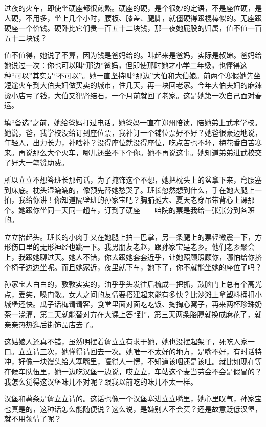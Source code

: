 \documentclass[lang=cn,newtx,12pt,scheme=chinese]{elegantbook}
\begin{document}
过夜的火车，即使坐硬座都很煎熬。硬座的硬，是个很妙的定语，不是座位硬，是人硬，不用多，坐上几个小时，腰板、膝盖、腿脚，就僵硬得跟棍棒似的。无座跟硬座一个价钱。硬卧比它们贵一百五十二块钱，那一夜她屁股的归属，值不值一百五十二块钱？

值不值得，她说了不算，因为钱是爸妈给的。叫起来是爸妈，实际是叔婶。爸妈给她说过一次：你也可以叫“那边”爸妈，但即使那时她才小学二年级，也懂得这种“可以”其实是“不可以”。她一直坚持叫“那边”大伯和大伯娘。前两个寒假她先坐短途火车到大伯夫妇做买卖的城市，住几天，再一块回老家。今年大伯夫妇的麻辣烫小店亏了钱，大伯又犯肾结石，一个月前就回了老家。这是她第一次自己面对春运。

填“备选”之前，她给爸妈打过电话。她爸妈一直在郑州陪读，陪她弟上武术学校。她说，爸，我学校没给订到座位票，我补订一个铺位票好不好？她爸很豪迈地说，年轻人，出力长力，补啥补？没得座位就没得座位，吃点苦也不坏，梅花香自苦寒来。再说那么大个火车，哪儿还坐不下个你。她不再说这事。她知道弟弟进武校交了好大一笔赞助费。

所以立立不想答班长那句话，为了掩饰这个不想，她把枕头上的盆拿下来，弯腰塞到床底。枕头湿漉漉的，像预先替她愁哭了。班长忽然想到什么，手在她大腿上一拍，我给你讲！你知道隔壁班的孙家宝吧？胸脯挺大、夏天老穿吊带背心上课那个。她跟你坐同一天同一趟车，订到了硬座——咱院的票是我给一张张分到各班的。

立立抬起头。班长的小肉手又在她腿上拍一巴掌，另一条腿上的票轻微震一下，方形伤口里的无形神经也跳一下。我男朋友老赵，跟孙家宝是老乡。他们老乡聚会上，我跟她聊过天。她人不错，你去跟她套套近乎，让她照顾照顾你，哪怕给你挤个椅子边边坐呢。而且她家近，夜里就下车，她下了，你不就能坐她的座位了吗？

孙家宝人白白的，敦敦实实的，油乎乎头发往后梳成一把抓，鼓脑门上总有个高光点，爱笑，嗓门敞。女人之间的友情要搭建起来能有多快？比沙滩上拿塑料桶扣小城堡还快。瓜子话梅请请客，食堂里面对面吃吃饭、掏掏心窝子，再来两杯珍珠奶茶一浇灌，第二天就能替对方在大课上答“到”，第三天两条胳膊就挽成麻花了，就亲亲热热逛后街饰品店去了。

这姑娘人还真不错，虽然明摆着詹立立有求于她，她也没摆起架子，死吃人家一口。立立请三次，她懂得请回去一次。她唯一不太好的地方，是嘴不好，有时话特冲，好像一块馒头给人塞嘴里，噎得人一愣，不知道该咽还是该吐。就比如现在等在候车队伍里，她一边吃汉堡一边说，哎立立，车站这个麦当劳会不会是假冒的？我怎么觉得这汉堡味儿不对呢？跟我以前吃的味儿不太一样。

汉堡和薯条是詹立立请的。这话也像一个汉堡塞进立立嘴里，她心里叹气，孙家宝也真是的，这种话怎么能随便说？这么说，是嫌别人不会买？还是故意贬低汉堡，就不用领情了呢？
\end{document}
